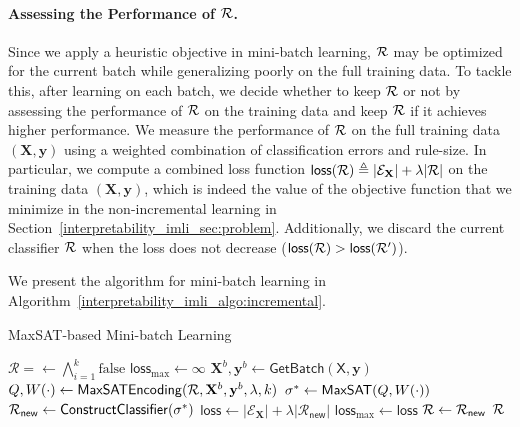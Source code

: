 \paragraph{Assessing  the Performance of $ {\mathcal{R}} $.} Since we apply a heuristic objective in mini-batch learning,  $ {\mathcal{R}} $ may be optimized for the current batch while generalizing poorly on the full training data. To tackle this, after learning on each batch, we decide whether to keep $ {\mathcal{R}} $ or not by assessing the performance of $ {\mathcal{R}} $ on the training data and keep $ {\mathcal{R}} $ if it achieves higher performance. We measure the performance of $ {\mathcal{R}} $ on the full training data $ (\mathbf{X}, \mathbf{y}) $ using a weighted combination of classification errors and rule-size. In particular, we compute a combined loss function $ \mathsf{loss}({\mathcal{R}}) \triangleq |\mathcal{E}_\mathbf{X}| +\lambda |\mathcal{R}| $ on the training data $ (\mathbf{X}, \mathbf{y}) $, which is indeed the value of the objective function that we minimize in the non-incremental learning in Section~\ref{interpretability_imli_sec:problem}. Additionally, we  discard the current classifier $ {\mathcal{R}} $ when the loss does not decrease ($ \mathsf{loss}({\mathcal{R}}) > \mathsf{loss}({\mathcal{R}}') $). 

We present the algorithm for mini-batch learning in Algorithm~\ref{interpretability_imli_algo:incremental}. 
\begin{algorithm}
	\caption{MaxSAT-based Mini-batch Learning}
	\label{interpretability_imli_algo:incremental}
	\begin{algorithmic}[1]
		\State $\mathcal{R} = \leftarrow \bigwedge_{i=1}^k\text{false} $ 
		\State $ \mathsf{loss}_{\max} \leftarrow \infty$ 
		 
		\State $ \mathbf{X}^b, \mathbf{y}^b \leftarrow \mathsf{GetBatch}(\mathsf{X},\mathbf{y}) $
		\State $ Q, W \! \left( \cdot \right) \leftarrow \mathsf{MaxSATEncoding}({\mathcal{R}}, \mathbf{X}^b, \mathbf{y}^b, \lambda, k) $ 
		\State $ \sigma^* \leftarrow \mathsf{MaxSAT}(Q,W \! \left( \cdot \right)) $
		\State $ {\mathcal{R}}_{\mathsf{new}} \leftarrow \mathsf{ConstructClassifier(\sigma^*)} $
		\State $ \mathsf{loss} \leftarrow  |\mathcal{E}_\mathbf{X}| +\lambda |\mathcal{R}_{\mathsf{new}}| $ 
		\State $ \mathsf{loss}_{\max} \leftarrow \mathsf{loss} $
		\State $ {\mathcal{R}} \leftarrow {\mathcal{R}}_{\mathsf{new}} $
		\EndIf
		\EndFor
		\State \Return $ {\mathcal{R}} $
		\EndFunction
	\end{algorithmic}
\end{algorithm} 	


